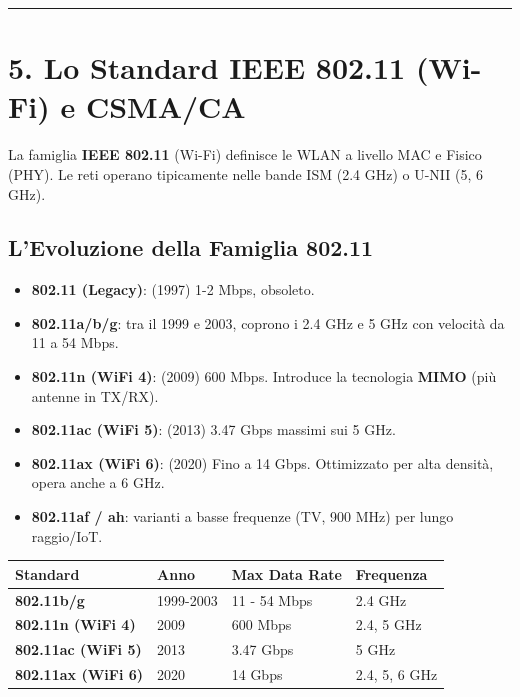 \documentclass[
  italian,
  openany]{book}
\newcounter{none} %
\providecommand{\tightlist}{%
  \setlength{\itemsep}{0pt}\setlength{\parskip}{0pt}}
\begin{document}
\begin{center}\rule{0.5\linewidth}{0.5pt}\end{center}

\section{5. Lo Standard IEEE 802.11 (Wi-Fi) e
CSMA/CA}\label{lo-standard-ieee-802.11-wi-fi-e-csmaca}

La famiglia \textbf{IEEE 802.11} (Wi-Fi) definisce le WLAN a livello MAC
e Fisico (PHY). Le reti operano tipicamente nelle bande ISM (2.4 GHz) o
U-NII (5, 6 GHz).

\subsection{L'Evoluzione della Famiglia
802.11}\label{levoluzione-della-famiglia-802.11}

\begin{itemize}
\tightlist
\item
  \textbf{802.11 (Legacy)}: (1997) 1-2 Mbps, obsoleto.
\item
  \textbf{802.11a/b/g}: tra il 1999 e 2003, coprono i 2.4 GHz e 5 GHz
  con velocità da 11 a 54 Mbps.
\item
  \textbf{802.11n (WiFi 4)}: (2009) 600 Mbps. Introduce la tecnologia
  \textbf{MIMO} (più antenne in TX/RX).
\item
  \textbf{802.11ac (WiFi 5)}: (2013) 3.47 Gbps massimi sui 5 GHz.
\item
  \textbf{802.11ax (WiFi 6)}: (2020) Fino a 14 Gbps. Ottimizzato per
  alta densità, opera anche a 6 GHz.
\item
  \textbf{802.11af / ah}: varianti a basse frequenze (TV, 900 MHz) per
  lungo raggio/IoT.
\end{itemize}

{\def\LTcaptype{none} %
\begin{longtable}[]{@{}llll@{}}
\toprule\noalign{}
\textbf{Standard} & \textbf{Anno} & \textbf{Max Data Rate} &
\textbf{Frequenza} \\
\midrule\noalign{}
\endhead
\bottomrule\noalign{}
\endlastfoot
\textbf{802.11b/g} & 1999-2003 & 11 - 54 Mbps & 2.4 GHz \\
\textbf{802.11n (WiFi 4)} & 2009 & 600 Mbps & 2.4, 5 GHz \\
\textbf{802.11ac (WiFi 5)} & 2013 & 3.47 Gbps & 5 GHz \\
\textbf{802.11ax (WiFi 6)} & 2020 & 14 Gbps & 2.4, 5, 6 GHz \\
\end{longtable}
}
\end{document}

